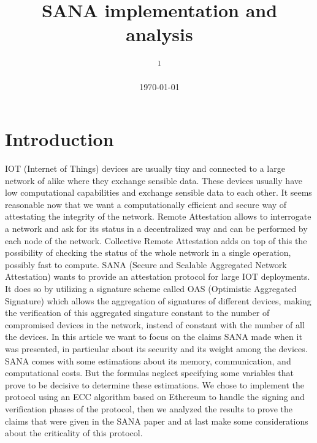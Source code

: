 \documentclass[10pt, a4paper, twocolumn]{article} %
\title{SANA implementation and analysis} %
\author{
	\authorstyle{Alessandro Rizzo and Davide Lazzaro} %
	\newline\newline %
	\textsuperscript{1}\institution{Università degli studi di Padova, Padova, Italy}\\ %
}
\date{\today} %
\begin{document}
\maketitle %

\thispagestyle{firstpage} %



\section{Introduction}

IOT (Internet of Things) devices are usually tiny and connected to a large network of alike where they exchange sensible data.
These devices usually have low computational capabilities and exchange sensible data to each other.
It seems reasonable now that we want a computationally efficient and secure way of attestating the integrity of the network.
Remote Attestation allows to interrogate a network and ask for its status in a decentralized way and can be performed by each node of the network.
Collective Remote Attestation adds on top of this the possibility of checking the status of the whole network in a single operation, possibly fast to compute.
SANA (Secure and Scalable Aggregated Network Attestation) wants to provide an attestation protocol for large IOT deployments.
It does so by utilizing a signature scheme called OAS (Optimistic Aggregated Signature) which allows the aggregation of signatures of different devices, making the verification of this aggregated singature constant to the number of compromised devices in the network, instead of constant with the number of all the devices.
In this article we want to focus on the claims SANA made when it was presented, in particular about its security and its weight among the devices.
SANA comes with some estimations about its memory, communication, and computational costs. But the formulas neglect specifying some variables that prove to be decisive to determine these estimations.
We chose to implement the protocol using an ECC algorithm based on Ethereum to handle the signing and verification phases of the protocol, then we analyzed the results to prove the claims that were given in the SANA paper and at last make some considerations about the criticality of this protocol.
\end{document}
